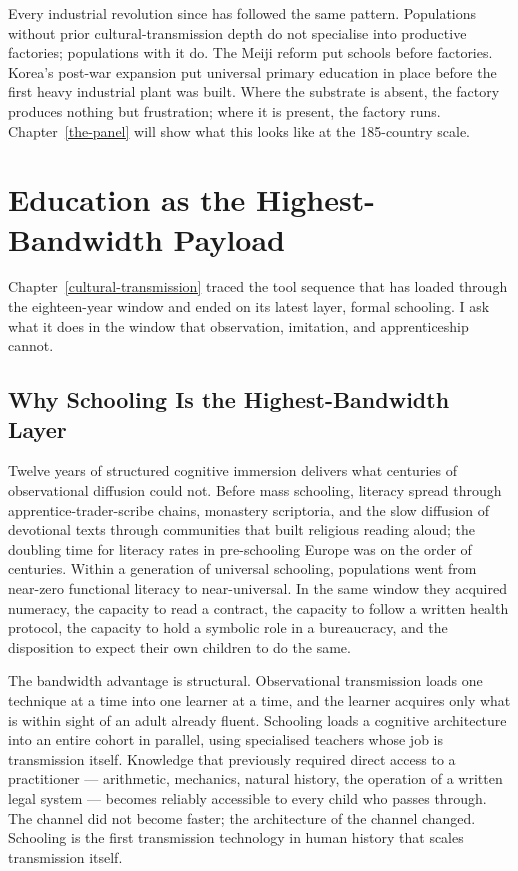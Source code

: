 \documentclass[12pt,letterpaper]{article}
\begin{document}
Every industrial revolution since has followed the same pattern.
Populations without prior cultural-transmission depth do not
specialise into productive factories; populations with it do. The
Meiji reform put schools before factories. Korea's post-war expansion
put universal primary education in place before the first heavy
industrial plant was built. Where the substrate is absent, the
factory produces nothing but frustration; where it is present, the
factory runs. Chapter~\ref{the-panel} will show what this looks like
at the 185-country scale.

\section{Education as the Highest-Bandwidth Payload}\label{education-as-payload}

Chapter~\ref{cultural-transmission} traced the tool sequence that has
loaded through the eighteen-year window and ended on its latest
layer, formal schooling. I ask what it does in the window that
observation, imitation, and apprenticeship cannot.

\subsection{Why Schooling Is the Highest-Bandwidth Layer}\label{why-schooling-is-the-highest-bandwidth-layer}

Twelve years of structured cognitive immersion delivers what centuries
of observational diffusion could not. Before mass schooling, literacy
spread through apprentice-trader-scribe chains, monastery scriptoria,
and the slow diffusion of devotional texts through communities that
built religious reading aloud; the doubling time for literacy rates
in pre-schooling Europe was on the order of centuries. Within a
generation of universal schooling, populations went from near-zero
functional literacy to near-universal. In the same window they acquired
numeracy, the capacity to read a contract, the capacity to follow a
written health protocol, the capacity to hold a symbolic role in a
bureaucracy, and the disposition to expect their own children to do
the same.

The bandwidth advantage is structural. Observational transmission
loads one technique at a time into one learner at a time, and the
learner acquires only what is within sight of an adult already
fluent. Schooling loads a cognitive architecture into an entire
cohort in parallel, using specialised teachers whose job is
transmission itself. Knowledge that previously required direct access
to a practitioner --- arithmetic, mechanics, natural history, the
operation of a written legal system --- becomes reliably accessible
to every child who passes through. The channel did not become faster;
the architecture of the channel changed. Schooling is the first
transmission technology in human history that scales transmission
itself.
\end{document}
